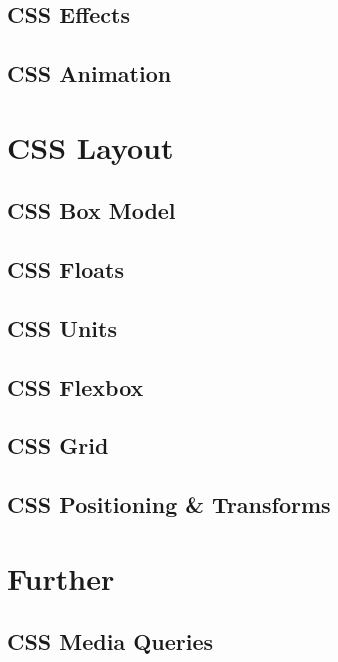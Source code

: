 \documentclass[b5paper,openany]{book}
\begin{document}
\section{CSS Effects}
%

\section{CSS Animation}
%


\chapter{CSS Layout}

\section{CSS Box Model}
%

\section{CSS Floats}
%

\section{CSS Units}
%

\section{CSS Flexbox}
%

\section{CSS Grid}
%

\section{CSS Positioning \& Transforms}
%


\chapter{Further}

\section{CSS Media Queries}
%
\end{document}
